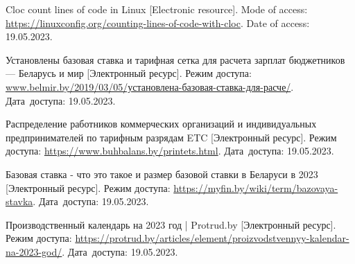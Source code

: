 \begin{thebibliography}{}
    Cloc count lines of code in Linux
    [Electronic resource].
    Mode of access: \url{https://linuxconfig.org/counting-lines-of-code-with-cloc}.
    Date of access: 19.05.2023.

    Установлены базовая ставка и тарифная сетка для расчета зарплат бюджетников — Беларусь и мир
    [Электронный ресурс].
    Режим доступа: \href{http://www.belmir.by/2019/03/05/%D1%83%D1%81%D1%82%D0%B0%D0%BD%D0%BE%D0%B2%D0%BB%D0%B5%D0%BD%D0%B0-%D0%B1%D0%B0%D0%B7%D0%BE%D0%B2%D0%B0%D1%8F-%D1%81%D1%82%D0%B0%D0%B2%D0%BA%D0%B0-%D0%B4%D0%BB%D1%8F-%D1%80%D0%B0%D1%81%D1%87%D0%B5/}
    {www.belmir.by/2019/03/05/установлена-базовая-ставка-для-расче/}.
    Дата~доступа: 19.05.2023.

    Распределение работников коммерческих организаций и индивидуальных предпринимателей по тарифным разрядам ETC
    [Электронный ресурс].
    Режим доступа: \url{https://www.buhbalans.by/printets.html}.
    Дата~доступа: 19.05.2023.

    Базовая ставка - что это такое и размер базовой ставки в Беларуси в 2023
    [Электронный ресурс].
    Режим доступа: \url{https://myfin.by/wiki/term/bazovaya-stavka}.
    Дата~доступа: 19.05.2023.

    Производственный календарь на 2023 год | Protrud.by
    [Электронный ресурс].
    Режим доступа: \url{https://protrud.by/articles/element/proizvodstvennyy-kalendar-na-2023-god/}.
    Дата~доступа: 19.05.2023.
    
\end{thebibliography}
\endgroup

\newpage
